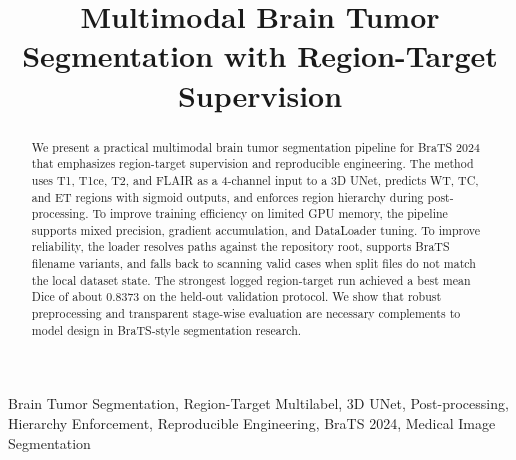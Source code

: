 \documentclass[conference]{IEEEtran}
\begin{document}
\title{Multimodal Brain Tumor Segmentation with Region-Target Supervision}

\author{
}

\maketitle

\begin{abstract}
We present a practical multimodal brain tumor segmentation pipeline for BraTS 2024 that emphasizes region-target supervision and reproducible engineering. The method uses T1, T1ce, T2, and FLAIR as a 4-channel input to a 3D UNet, predicts WT, TC, and ET regions with sigmoid outputs, and enforces region hierarchy during post-processing. To improve training efficiency on limited GPU memory, the pipeline supports mixed precision, gradient accumulation, and DataLoader tuning. To improve reliability, the loader resolves paths against the repository root, supports BraTS filename variants, and falls back to scanning valid cases when split files do not match the local dataset state. The strongest logged region-target run achieved a best mean Dice of about 0.8373 on the held-out validation protocol. We show that robust preprocessing and transparent stage-wise evaluation are necessary complements to model design in BraTS-style segmentation research.
\end{abstract}

\begin{IEEEkeywords}
Brain Tumor Segmentation, Region-Target Multilabel, 3D UNet, Post-processing, Hierarchy Enforcement, Reproducible Engineering, BraTS 2024, Medical Image Segmentation
\end{IEEEkeywords}
\end{document}
